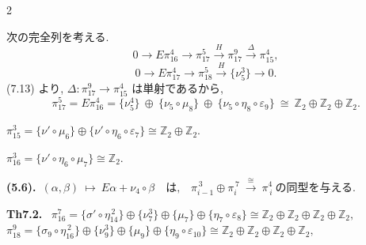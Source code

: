 \documentclass[10pt, leqno]{ltjsarticle}
\newcommand{\gen}[1]{\{#1\}}       %
\newcommand{\pit}[2]{\pi_{#1}^{#2}}
\numberwithin{equation}{section}
\theoremstyle{plain}
\theoremstyle{definition}
\theoremstyle{remark}
\begin{document}
\begin{paracol}{2}

次の完全列を考える.
\[
0\longrightarrow E\pi_{16}^{4}\xrightarrow{\ \ } \pi_{17}^{5}
 \xrightarrow{\,H\,} \pi_{17}^{9}\xrightarrow{\,\Delta\,} \pi_{15}^{4},
\]
\[
0\longrightarrow E\pi_{17}^{4}\xrightarrow{\ \ } \pi_{18}^{5}
 \xrightarrow{\,H\,} \gen{\nu_5^{3}}\longrightarrow 0 .
\]
(7.13) より, \(\Delta:\pi_{17}^{9}\to\pi_{15}^{4}\) は単射であるから, 
\[
\pi_{17}^{5}
 = E\pi_{16}^{4}
 = \gen{\nu_5^{4}}\ \oplus\ \gen{\nu_5\circ\mu_8}\ \oplus\ \gen{\nu_5\circ\eta_8\circ\varepsilon_9}
 \ \cong\ \mathbb{Z}_2\oplus\mathbb{Z}_2\oplus\mathbb{Z}_2 .
\]

\switchcolumn

\noindent
\(\pit{15}{3}
= \gen{\nu'\circ\mu_6}\oplus\gen{\nu'\circ\eta_6\circ\varepsilon_7}
\cong \mathbb{Z}_2\oplus\mathbb{Z}_2.\)

\noindent
\(\pi_{16}^3=\gen{\nu'\circ\eta_6\circ\mu_7}\cong\mathbb{Z}_2 .\)

\noindent
\textbf{(5.6).}\
\((\alpha,\beta)\ \longmapsto\ E\alpha+\nu_{4}\circ\beta
\quad\text{は,}\quad
\pi^{\,3}_{i-1}\oplus \pi^{\,7}_{i}\ \xrightarrow{\ \cong\ }\ \pi_{\,i}^{4}
\ \text{の同型を与える. }\)

\noindent
\textbf{Th7.2.}\
\(\pit{16}{7}=\gen{\sigma'\circ\eta_{14}^{\,2}}\oplus\gen{\nu_{7}^{3}}\oplus\gen{\mu_{7}}\oplus\gen{\eta_{7}\circ\varepsilon_{8}}
\cong\mathbb Z_{2}\oplus\mathbb Z_{2}\oplus\mathbb Z_{2}\oplus\mathbb Z_{2},\)\\
\(\pit{18}{9}=\gen{\sigma_{9}\circ\eta_{16}^{\,2}}\oplus\gen{\nu_{9}^{3}}\oplus\gen{\mu_{9}}\oplus\gen{\eta_{9}\circ\varepsilon_{10}}
\cong\mathbb Z_{2}\oplus\mathbb Z_{2}\oplus\mathbb Z_{2}\oplus\mathbb Z_{2},\)


\end{paracol}
\end{document}
